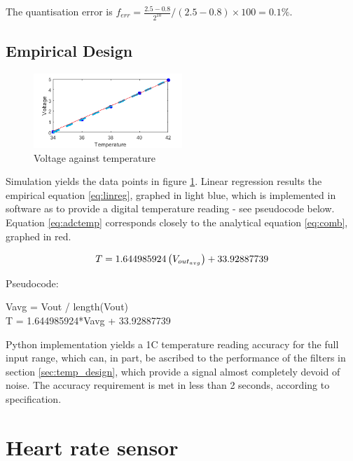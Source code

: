 The quantisation error is $f_{err} = \frac{2.5 - 0.8}{2^{10}} / (2.5 - 0.8) \times 100 = 0.1\%$. 


	\subsection{Empirical Design} \label{sec:ADCTempEmp}
\begin{figure}
\centering
\vspace{-0.6cm}
\includegraphics[width=0.5\textwidth]{./Figures/linreg}
\caption{Voltage against temperature}
\label{fig:linreg}
\end{figure}
Simulation yields the data points in figure \ref{fig:linreg}. Linear regression results the empirical equation \ref{eq:linreg}, graphed in light blue, which is implemented in software as to provide a digital temperature reading - see pseudocode below. Equation \ref{eq:adctemp} corresponds closely to the analytical equation \ref{eq:comb}, graphed in red. 
 
\begin{equation}
\vspace{0.2cm}
\label{eq:linreg}
T = 1.644985924\left(V_{out_{avg}}\right) + 33.92887739
\end{equation}

\pagebreak

Pseudocode:
\begin{algorithm}
V\textunderscore avg = V\textunderscore out / length(V\textunderscore out)\\
T = 1.644985924*V\textunderscore avg + 33.92887739
\end{algorithm}

Python implementation yields a 1\degree C temperature reading accuracy for the full input range, which can, in part, be ascribed to the performance of the filters in section \ref{sec:temp_design}, which provide a signal almost completely devoid of noise. The accuracy requirement is met in less than 2 seconds, according to specification.


\section{Heart rate sensor}
\label{sec:ADCHeart}

